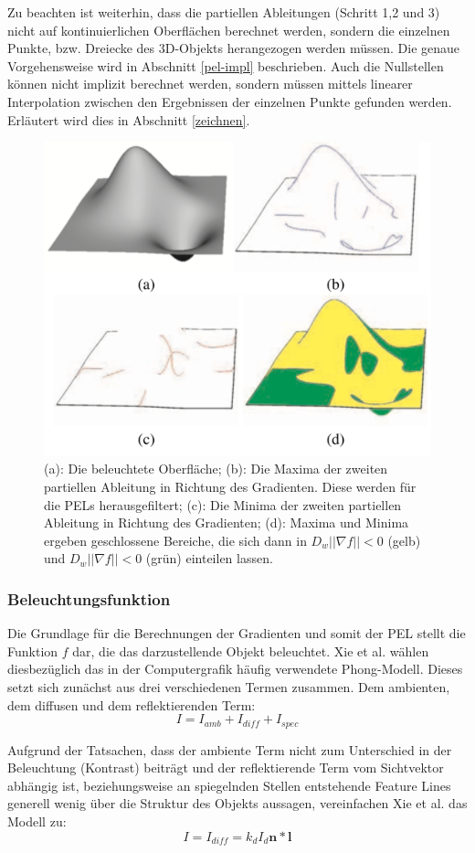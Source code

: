 \documentclass{paperStyle}
\begin{document}
Zu beachten ist weiterhin, dass die partiellen Ableitungen (Schritt 1,2 und 3) nicht auf kontinuierlichen Oberflächen berechnet werden, sondern die einzelnen Punkte, bzw. Dreiecke des 3D-Objekts herangezogen werden müssen. Die genaue Vorgehensweise wird in Abschnitt \ref{pel-impl} beschrieben. Auch die Nullstellen können nicht implizit berechnet werden, sondern müssen mittels linearer Interpolation zwischen den Ergebnissen der einzelnen Punkte gefunden werden. Erläutert wird dies in Abschnitt \ref{zeichnen}. 
\begin{figure}
	\centering
		\includegraphics[width=0.7\linewidth]{abcd.png}
	\caption{(a): Die beleuchtete Oberfläche; (b): Die Maxima der zweiten partiellen Ableitung in Richtung des Gradienten. Diese werden für die PELs herausgefiltert; (c): Die Minima der zweiten partiellen Ableitung in Richtung des Gradienten; (d): Maxima und Minima ergeben geschlossene Bereiche, die sich dann in $D_{w}||\nabla f || < 0$ (gelb) und $D_{w}||\nabla f || < 0$ (grün) einteilen lassen.}
	\label{fig:abcd}
\end{figure}
\subsubsection{Beleuchtungsfunktion}
Die Grundlage für die Berechnungen der Gradienten und somit der PEL stellt die Funktion $f$ dar, die das darzustellende Objekt beleuchtet. 
Xie et al. wählen diesbezüglich das in der Computergrafik häufig verwendete Phong-Modell.
Dieses setzt sich zunächst aus drei verschiedenen Termen zusammen. Dem ambienten, dem diffusen und dem reflektierenden Term:
\begin{equation}
I = I_{amb} + I_{diff} + I_{spec}
\end{equation} 

Aufgrund der Tatsachen, dass der ambiente Term nicht zum Unterschied in der Beleuchtung (Kontrast) beiträgt und der reflektierende Term vom Sichtvektor abhängig ist, beziehungsweise an spiegelnden Stellen entstehende Feature Lines generell wenig über die Struktur des Objekts aussagen, vereinfachen Xie et al. das Modell zu:
\begin{equation}
I = I_{diff} = k_{d}I_{d}\mathbf{n}*\mathbf{l}
\end{equation} 
\end{document}
